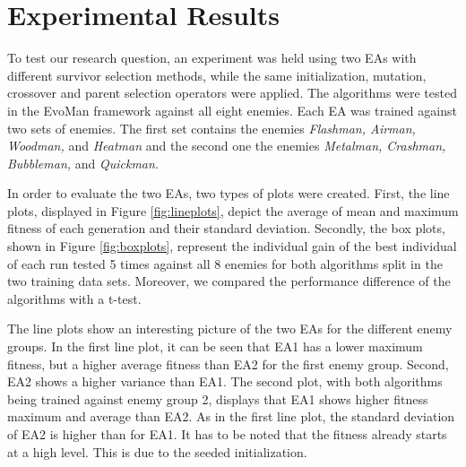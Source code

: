 \section{Experimental Results}

To test our research question, an experiment was held using two EAs with different survivor selection methods, while the same initialization, mutation, crossover and parent selection operators were applied. The algorithms were tested in the EvoMan framework \cite{defranca2020evoman} against all eight enemies. Each EA was trained against two sets of enemies. The first set contains the enemies \textit{Flashman, Airman, Woodman,} and \textit{Heatman} and the second one the enemies \textit{Metalman, Crashman, Bubbleman,} and \textit{Quickman}.

In order to evaluate the two EAs, two types of plots were created. First, the line plots, displayed in Figure \ref{fig:lineplots}, depict the average of mean and maximum fitness of each generation and their standard deviation. Secondly, the box plots, shown in Figure \ref{fig:boxplots}, represent the individual gain of the best individual of each run tested 5 times against all 8 enemies for both algorithms split in the two training data sets. Moreover, we compared the performance difference of the algorithms with a t-test.

The line plots show an interesting picture of the two EAs for the different enemy groups. In the first line plot, it can be seen that EA1 has a lower maximum fitness, but a higher average fitness than EA2 for the first enemy group. Second, EA2 shows a higher variance than EA1. The second plot, with both algorithms being trained against enemy group 2, displays that EA1 shows higher fitness maximum and average than EA2. As in the first line plot, the standard deviation of EA2 is higher than for EA1. It has to be noted that the fitness already starts at a high level. This is due to the seeded initialization. 

\intextsep

